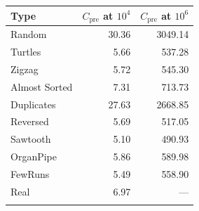 \small
\begin{tabular*}{\columnwidth}{@{\extracolsep\fill}lrr@{\extracolsep\fill}}
\toprule
Type & $C_{\text{pre}}$ at $10^4$ & $C_{\text{pre}}$ at $10^6$\\
\midrule
Random & 30.36 & 3049.14 \\
Turtles & 5.66 & 537.28 \\
Zigzag & 5.72 & 545.30 \\
Almost Sorted & 7.31 & 713.73 \\
Duplicates & 27.63 & 2668.85 \\
Reversed & 5.69 & 517.05 \\
Sawtooth & 5.10 & 490.93 \\
OrganPipe & 5.86 & 589.98 \\
FewRuns & 5.49 & 558.90 \\
Real & 6.97 & {---} \\
\botrule
\end{tabular*}
